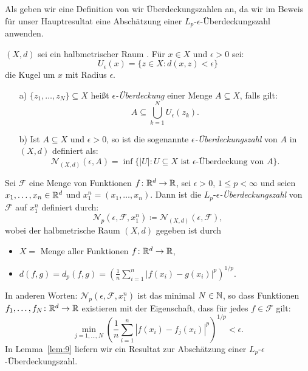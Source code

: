 Als geben wir eine Definition von wir Überdeckungszahlen an, da wir im Beweis für unser Hauptresultat eine Abschätzung einer $L_p\text{-}\epsilon$-Überdeckungszahl anwenden.
\begin{defn}
\label{ueberdeckung}
$(X, d)$ sei ein halbmetrischer Raum \cite{forster2016} . Für $x \in X$ und $\epsilon > 0$ sei:
$$U_{\epsilon}(x) = \{z \in X : d(x, z) < \epsilon\}$$
die Kugel um $x$ mit Radius $\epsilon$.
\begin{itemize}
\item[a)] $\{z_1,\dots,z_N\} \subseteq X$ heißt $\epsilon$\textit{-Überdeckung} einer Menge $A \subseteq X$, falls gilt:
$$A \subseteq \bigcup_{k = 1}^N U_{\epsilon}(z_k).$$
\item[b)] Ist $A \subseteq X$ und $\epsilon > 0$, so ist die sogenannte $\epsilon$\textit{-Überdeckungszahl} von $A$ in $(X,d)$ definiert als:
$$\mathcal{N}_{(X,d)}(\epsilon, A) = \inf\big\{|U| : U \subseteq X \text{ ist } \epsilon\text{-Überdeckung von } A\big\}.$$   
\end{itemize}
\end{defn} 
\begin{defn}
\label{lpe}
Sei $\mathcal{F}$ eine Menge von Funktionen $f\colon \mathbb{R}^d \to \mathbb{R}$, sei $\epsilon > 0$, $1 \leq p < \infty$ und seien $x_1,\dots,x_n \in \mathbb{R}^d$ und $x_1^n = (x_1,\dots,x_n).$ Dann ist die $L_p$-$\epsilon$\textit{-Überdeckungszahl} von $\mathcal{F}$ auf $x_1^n$ definiert durch:
$$\mathcal{N}_p(\epsilon, \mathcal{F}, x_1^n) \coloneqq \mathcal{N}_{(X,d)}(\epsilon, \mathcal{F}),$$
wobei der halbmetrische Raum $(X, d)$ gegeben ist durch
\begin{itemize}
\item $X = $ Menge aller Funktionen $f\colon \mathbb{R}^d \to \mathbb{R}$,
\item $d(f, g) = d_p(f, g) = (\frac{1}{n}\sum_{i = 1}^n |f(x_i) - g(x_i)|^p)^{1/p} .$
\end{itemize}
\end{defn}
In anderen Worten: $\mathcal{N}_p(\epsilon, \mathcal{F}, x_1^n)$ ist das minimal $N \in \mathbb{N}$, so dass Funktionen $f_1,\dots,f_N\colon \mathbb{R}^d \to \mathbb{R}$ existieren mit der Eigenschaft, dass für jedes $f \in \mathcal{F}$ gilt:
$$\min_{j = 1,\dots,N}(\frac{1}{n}\sum_{i = 1}^n|f(x_i) - f_j(x_i)|^p)^{1/p} < \epsilon.$$
In Lemma~\ref{lem:9} liefern wir ein Resultat zur Abschätzung einer $L_p$-$\epsilon$-Überdeckungszahl.

